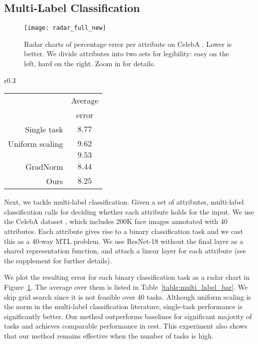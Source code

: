 \documentclass{article}
\begin{document}
\subsection{Multi-Label Classification}

\begin{figure}[t]
\texttt{[image: radar\_full\_new]}
\vspace{1mm}
\caption{Radar charts of percentage error per attribute on CelebA \citep{celeba}. Lower is better. We divide attributes into two sets for legibility: easy on the left, hard on the right. Zoom in for details.}
\label{fig:multi_label_radar}
\end{figure}


\begin{wraptable}{r}{0.3\textwidth}
\begin{tabular}{r@{\hspace{2mm}}c@{}}
\toprule
& Average  \\
&  error \\
\midrule
Single task & $8.77$ \\
Uniform scaling & $9.62$ \\
\citealt{Kendall2018} & $9.53$ \\
GradNorm & $8.44$ \\
Ours & $\mathbf{8.25}$  \\
\bottomrule
\end{tabular}
\label{table:multi_label_bar}
\end{wraptable}

Next, we tackle multi-label classification. Given a set of attributes, multi-label classification calls for deciding whether each attribute holds for the input. We use the CelebA dataset \citep{celeba}, which includes 200K face images annotated with 40 attributes. Each attribute gives rise to a binary classification task and we cast this as a 40-way MTL problem. We use ResNet-18 \citep{resnet} without the final layer as a shared representation function, and attach a linear layer for each attribute (see the supplement for further details).


We plot the resulting error for each binary classification task as a radar chart in Figure~\ref{fig:multi_label_radar}. The average over them is listed in Table~\ref{table:multi_label_bar}. We skip grid search since it is not feasible over 40 tasks. Although uniform scaling is the norm in the multi-label classification literature, single-task performance is significantly better. Our method outperforms baselines for significant majority of tasks and achieves comparable performance in rest. This experiment also shows that our method remains effective when the number of tasks is high.
\end{document}
